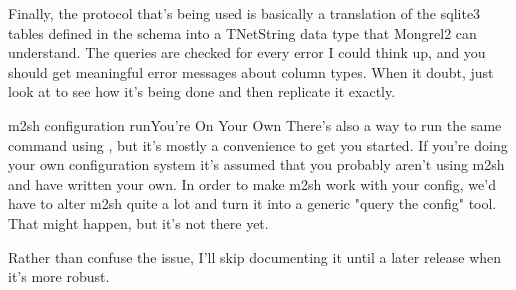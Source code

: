 Finally, the protocol that's being used is basically a translation of the sqlite3 tables
defined in the  schema into a TNetString data type that
Mongrel2 can understand.  The queries are checked for every error I could think up, and
you should get meaningful error messages about column types.  When it doubt, just
look at  to see how it's being done and then replicate it exactly.

\begin{aside}{m2sh configuration run}{You're On Your Own}
There's also a way to run the same command using , but it's
mostly a convenience to get you started.  If you're doing your own
configuration system it's assumed that you probably aren't using
m2sh and have written your own.  In order to make m2sh work with your
config, we'd have to alter m2sh quite a lot and turn it into a generic
"query the config" tool.  That might happen, but it's not there yet.

Rather than confuse the issue, I'll skip documenting it until a later
release when it's more robust.
\end{aside}

